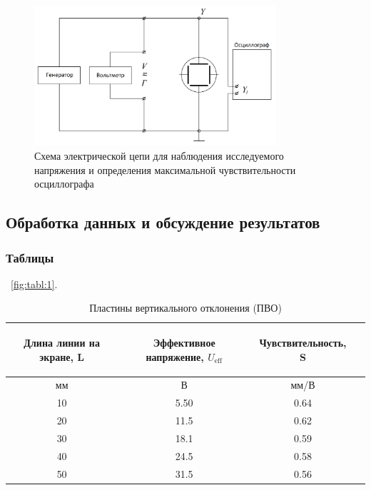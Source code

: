 \begin{figure}[H]
\centering
\includegraphics[width=0.8\textwidth]{Scheme4.png}
\caption{Схема электрической цепи для наблюдения исследуемого напряжения и определения максимальной чувствительности осциллографа}
\label{fig:Scheme4}
\end{figure}

\subsection{Обработка данных и обсуждение результатов}
 
\subsubsection{Таблицы}

~\ref{fig:tabl:1}.

\begin{center}
\begin{table}[H]
\centering
\caption{Пластины вертикального отклонения (ПВО)}
\label{tabl:1}
\begin{tabular}{|c|c|c|c|}
\hline
\begin{minipage}{5cm}
\begin{center}
    Длина линии на экране, L
\end{center}
\end{minipage} &
\begin{minipage}{5cm}
\begin{center}
    Эффективное напряжение, $U_{\text{eff}}$
\end{center}
\end{minipage} &
\begin{minipage}{5cm}
\begin{center}
    Чувствительность, S
\end{center}
\end{minipage}\\
\hline
мм&В&мм/В\\
\hline
10  &  5.50  &  0.64 \\
20  &  11.5  &  0.62 \\
30  &  18.1  &  0.59 \\
40  &  24.5  &  0.58 \\
50  &  31.5  &  0.56 \\
\hline
\end{tabular}
\end{table}
\end{center}

